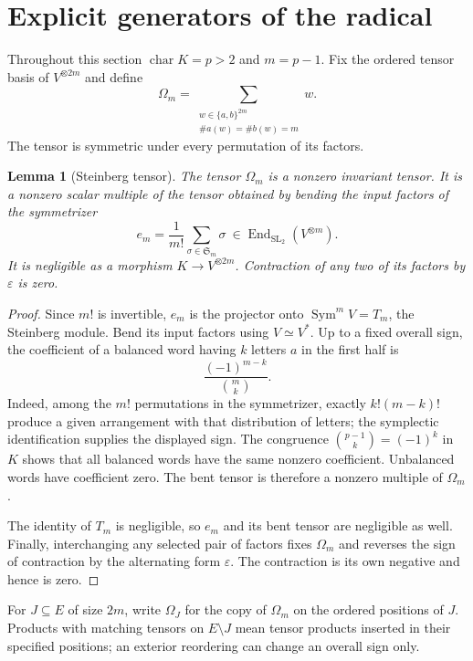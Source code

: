 \documentclass[11pt]{article}
\newtheorem{lemma}[theorem]{Lemma}
\theoremstyle{definition}
\theoremstyle{remark}
\numberwithin{equation}{section}
\DeclareMathOperator{\Sym}{Sym}
\DeclareMathOperator{\End}{End}
\DeclareMathOperator{\SL}{SL}
\newcommand{\kk}{K}
\newcommand{\eps}{\varepsilon}
\begin{document}
\section{Explicit generators of the radical}
\label{sec:generators}

Throughout this section $\operatorname{char}\kk=p>2$ and $m=p-1$.
Fix the ordered tensor basis of $V^{\otimes 2m}$ and define
\begin{equation}\label{eq:omega}
 \Omega_m=\sum_{\substack{w\in\{a,b\}^{2m}\\
                     \#a(w)=\#b(w)=m}} w.
\end{equation}
The tensor is symmetric under every permutation of its factors.

\begin{lemma}[Steinberg tensor]\label{lem:steinberg}
The tensor $\Omega_m$ is a nonzero invariant tensor. It is a nonzero
scalar multiple of the tensor obtained by bending the input factors of
the symmetrizer
\[
 e_m=\frac{1}{m!}\sum_{\sigma\in\mathfrak S_m}\sigma
       \ \in\End_{\SL_2}(V^{\otimes m}).
\]
It is negligible as a morphism $\kk\to V^{\otimes 2m}$.
Contraction of any two of its factors by $\eps$ is zero.
\end{lemma}

\begin{proof}
Since $m!$ is invertible, $e_m$ is the projector onto
$\Sym^mV=T_m$, the Steinberg module. Bend its input factors using
$V\simeq V^*$. Up to a fixed overall sign, the coefficient of a
balanced word having $k$ letters $a$ in the first half is
\[
 \frac{(-1)^{m-k}}{\binom{m}{k}}.
\]
Indeed, among the $m!$ permutations in the symmetrizer, exactly
$k!(m-k)!$ produce a given arrangement with that distribution of
letters; the symplectic identification supplies the displayed sign.
The congruence
$\binom{p-1}{k}=(-1)^k$ in $\kk$ shows that all balanced words have the
same nonzero coefficient. Unbalanced words have coefficient zero.
The bent tensor is therefore a nonzero multiple of $\Omega_m$.

The identity of $T_m$ is negligible, so $e_m$ and its bent tensor are
negligible as well. Finally, interchanging any selected pair of factors
fixes $\Omega_m$ and reverses the sign of contraction by the alternating
form $\eps$. The contraction is its own negative and hence is zero.
\end{proof}

For $J\subseteq E$ of size $2m$, write $\Omega_J$ for the copy of
$\Omega_m$ on the ordered positions of $J$. Products with matching
tensors on $E\setminus J$ mean tensor products inserted in their specified
positions; an exterior reordering can change an overall sign only.
\end{document}
